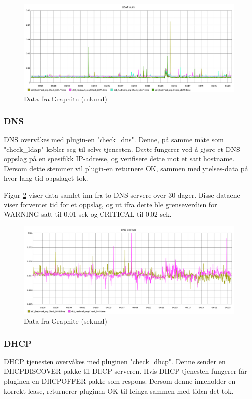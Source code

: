 \begin{figure}[H]
    \centering
    \includegraphics[width=1.0\textwidth]{img/ldap-auth-inv}
    \caption{Data fra Graphite (sekund)}
    \label{ldapauth-inv}
\end{figure}

\subsubsection*{DNS}

DNS overvåkes med plugin-en "check\_dns". Denne, på samme måte som "check\_ldap" kobler seg til selve tjenesten. Dette fungerer ved å gjøre et DNS-oppslag på en spesifikk IP-adresse, og verifisere dette mot et satt hostname. Dersom dette stemmer vil plugin-en returnere OK, sammen med ytelses-data på hvor lang tid oppslaget tok.

Figur \ref{dns-inv} viser data samlet inn fra to DNS servere over 30 dager. Disse dataene viser forventet tid for et oppslag, og ut ifra dette ble grenseverdien for WARNING satt til 0.01 sek og CRITICAL til 0.02 sek.

\begin{figure}[H]
    \centering
    \includegraphics[width=1.0\textwidth]{img/dns-inv}
    \caption{Data fra Graphite (sekund)}
    \label{dns-inv}
\end{figure}

\subsubsection*{DHCP}
DHCP tjenesten overvåkes med pluginen "check\_dhcp". Denne sender en DHCPDISCOVER-pakke til DHCP-serveren. Hvis DHCP-tjenesten fungerer får pluginen en DHCPOFFER-pakke som respons. Dersom denne inneholder en korrekt lease, returnerer pluginen OK til Icinga sammen med tiden det tok.

